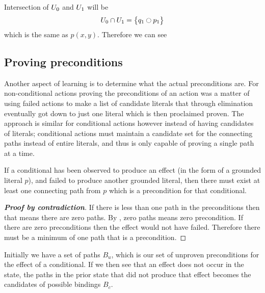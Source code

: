 \documentclass[\master/Master.tex]{subfiles}
\begin{document}
\begin{example}
   Intersection of $U_0$ and $U_1$ will be
	   \begin{align*}
	   	U_0 \cap U_1=
	   	\left\{
	   	\begin{gathered}
	   		q_1 \ocircle p_1 
	   	\end{gathered}	
	   	\right\}	
	   \end{align*}
   which is the same as $p(x,y)$. Therefore we can see 
   
   
   
   
\end{example}

\subsection{Proving preconditions}
Another aspect of learning is to determine what the actual preconditions are.
For non-conditional actions proving the preconditions of an action was a matter of using failed actions to make a list of candidate literals that through elimination eventually got down to just one literal which is then proclaimed proven. The approach is similar for conditional actions however instead of having candidates of literals; conditional actions must maintain a candidate set for the connecting paths instead of entire literals, and thus is only capable of proving a single path at a time.

\begin{theorem}\label{thm:minimum-one-binding}
    If a conditional has been observed to produce an effect (in the form of a grounded literal $p$), and failed to produce another grounded literal, then there must exist at least one connecting path from $p$ which is a precondition for that conditional.
\end{theorem}

\begin{proof}[\textbf{Proof by contradiction}] 
    If there is less than one path in the preconditions then that means there are zero paths. By , zero paths means zero precondition. If there are zero preconditions then the effect would not have failed. Therefore there must be a minimum of one path that is a precondition.
\end{proof}

Initially we have a set of paths $B_u$, which is our set of unproven preconditions for the effect of a conditional.
If we then see that an effect does not occur in the state, the paths in the prior state that did not produce that effect becomes the candidates of possible bindings $B_c$.
\end{document}
